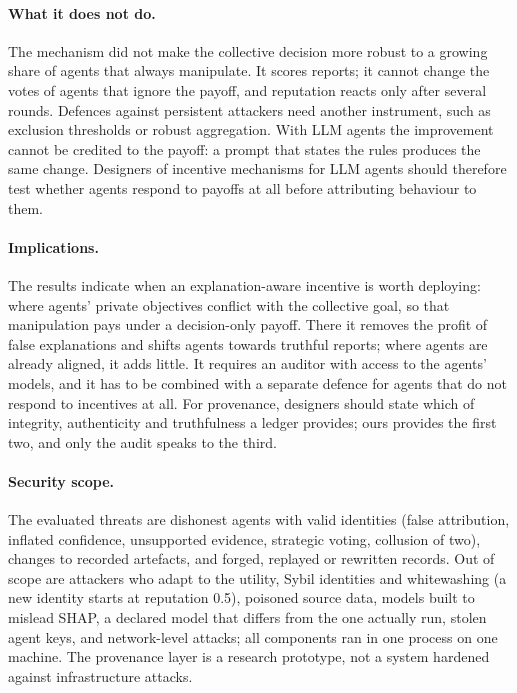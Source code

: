 \documentclass[pdflatex,sn-basic]{sn-jnl}
\begin{document}
\paragraph{What it does not do.} The mechanism did not make the collective decision more
robust to a growing share of agents that always manipulate. It scores reports; it cannot
change the votes of agents that ignore the payoff, and reputation reacts only after several
rounds. Defences against persistent attackers need another instrument, such as exclusion
thresholds or robust aggregation. With LLM agents the improvement cannot be credited to the
payoff: a prompt that states the rules produces the same change. Designers of incentive
mechanisms for LLM agents should therefore test whether agents respond to payoffs at all
before attributing behaviour to them.

\paragraph{Implications.} The results indicate when an explanation-aware incentive is worth
deploying: where agents' private objectives conflict with the collective goal, so that
manipulation pays under a decision-only payoff. There it removes the profit of false
explanations and shifts agents towards truthful reports; where agents are already aligned,
it adds little. It requires an auditor with access to the agents' models, and it has to be
combined with a separate defence for agents that do not respond to incentives at all. For
provenance, designers should state which of integrity, authenticity and truthfulness a
ledger provides; ours provides the first two, and only the audit speaks to the third.

\paragraph{Security scope.} The evaluated threats are dishonest agents with valid identities
(false attribution, inflated confidence, unsupported evidence, strategic voting, collusion of
two), changes to recorded artefacts, and forged, replayed or rewritten records. Out of scope
are attackers who adapt to the utility, Sybil identities and whitewashing (a new identity
starts at reputation 0.5), poisoned source data, models built to mislead SHAP, a declared
model that differs from the one actually run, stolen agent keys, and network-level attacks;
all components ran in one process on one machine. The provenance layer is a research
prototype, not a system hardened against infrastructure attacks.
\end{document}
